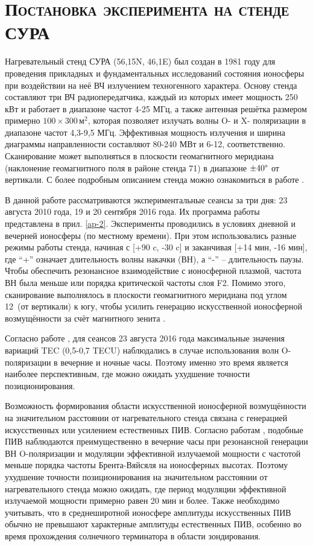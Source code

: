 \section{\textsc{Постановка эксперимента на стенде СУРА}}

Нагревательный стенд СУРА (56,15\degree N, 46,1\degree E) был создан в 1981 году для проведения прикладных и фундаментальных исследований состояния ионосферы при воздействии на неё ВЧ излучением техногенного характера.  
Основу стенда составляют три ВЧ радиопередатчика, каждый из которых имеет мощность 250 кВт и работает в диапазоне частот 4-25 МГц, а также антенная решётка размером примерно $100\times300\,\text{м}^2$, которая позволяет излучать волны O- и X- поляризации в диапазоне частот 4,3-9,5 МГц. 
Эффективная мощность излучения и ширина диаграммы направленности составляют 80-240 МВт и 6-12\degree, соответственно.  
Сканирование может выполняться в плоскости геомагнитного меридиана (наклонение геомагнитного поля в районе стенда 71\degree) в диапазоне $\pm40\degree$ от вертикали.     
С более подробным описанием стенда можно ознакомиться в работе \cite{Belikovich2007}.

В данной работе рассматриваются экспериментальные сеансы за три дня: 23 августа 2010 года, 19 и 20 сентября 2016 года. 
Их программа работы представлена в прил. \ref{ap-2}.
Эксперименты проводились в условиях дневной и вечерней ионосферы (по местному времени).
При этом использовались разные режимы работы стенда, начиная с [+90 c, -30 c] и заканчивая [+14 мин, -16 мин], где ``+'' означает длительность волны накачки (ВН), а ``-'' -- длительность паузы.  
Чтобы обеспечить резонансное взаимодействие с ионосферной плазмой, частота ВН была меньше или порядка критической частоты слоя F2. 
Помимо этого, сканирование выполнялось в плоскости геомагнитного меридиана под углом 12\degree~(от вертикали) к югу, чтобы усилить генерацию искусственной ионосферной возмущённости за счёт магнитного зенита \cite{Streltsov2018, Tereshchenko2004}.

Согласно работе \cite{Kunitsyn2012}, для сеансов 23 августа 2016 года максимальные значения вариаций TEC (0,5-0,7 TECU) наблюдались в случае использования волн O-поляризации в вечерние и ночные часы.
Поэтому именно это время является наиболее перспективным, где можно ожидать ухудшение точности позиционирования. 

Возможность формирования области искусственной ионосферной возмущённости на значительном расстоянии от нагревательного стенда связана с генерацией искусственных или усилением естественных ПИВ.
Согласно работам \cite{Chernogor2011, Chernogor2013, Kunitsyn2012}, подобные ПИВ наблюдаются преимущественно в вечерние часы при резонансной генерации ВН O-поляризации и модуляции эффективной излучаемой мощности с частотой меньше порядка частоты Брента-Вяйсяля на ионосферных высотах. 
Поэтому ухудшение точности позиционирования на значительном расстоянии от нагревательного стенда можно ожидать, где период модуляции эффективной излучаемой мощности примерно равен 20 мин и более.
Также необходимо учитывать, что в среднеширотной ионосфере амплитуды искусственных ПИВ обычно не превышают характерные амплитуды естественных ПИВ, особенно во время прохождения солнечного терминатора в области зондирования.

